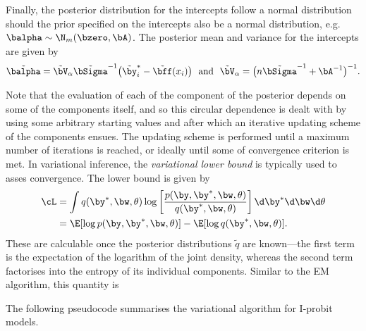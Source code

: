 Finally, the posterior distribution for the intercepts follow a normal distribution should the prior specified on the intercepts also be a normal distribution, e.g. $\balpha \sim \N_m(\bzero,\bA)$.
The posterior mean and variance for the intercepts are given by
\[
  \tilde\balpha = \tilde\bV_\alpha \tilde\bSigma^{-1}\big(\tilde\by_i^* - \tilde\bff(x_i)\big) \ \text{ and } \ \tilde\bV_\alpha = \big(n\tilde\bSigma^{-1} + \bA^{-1}\big)^{-1}.
\]

Note that the evaluation of each of the component of the posterior depends on some of the components itself, and so this circular dependence is dealt with by using some arbitrary starting values and after which an iterative updating scheme of the components ensues.
The updating scheme is performed until a maximum number of iterations is reached, or ideally until some of convergence criterion is met.
In variational inference, the \emph{variational lower bound} is typically used to asses convergence.
The lower bound is given by
\begin{align*}
  \cL 
  &= \int q(\by^*,\bw,\theta) \log \left[ \frac{p(\by,\by^*,\bw,\theta)}{q(\by^*,\bw,\theta)} \right] \d\by^* \d\bw \d\theta \\
  &= \E[\log p(\by,\by^*,\bw,\theta)] - \E[\log q(\by^*,\bw,\theta)].
\end{align*}
These are calculable once the posterior distributions $\tilde q$ are known---the first term is the expectation of the logarithm of the joint density, whereas the second term factorises into the entropy of its individual components.
Similar to the EM algorithm, this quantity is


The following pseudocode summarises the variational algorithm for I-probit models.

